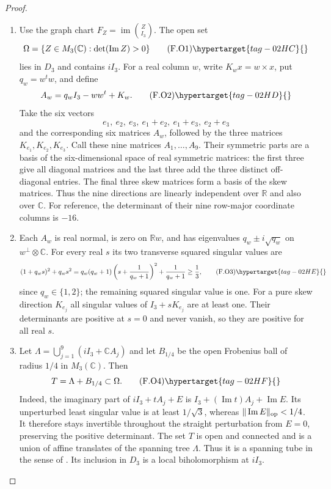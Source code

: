 \begin{proof}
\begin{enumerate}[label={$\langle1\rangle$\arabic*.}]
\item Use the graph chart $F_Z=\operatorname{im}\binom Z{I_3}$.
The open set
\[
 \Omega=\{Z\in M_3(\mathbb C):\det(\operatorname{Im}Z)>0\}
 \tag{F.O1}\hypertarget{tag-02HC}{}\label{maps:eq:F.O1}
\]
lies in $D_3$ and contains $iI_3$.  For a real column $w$, write
$K_w x=w\times x$, put $q_w=w^tw$, and define
\[
 A_w=q_wI_3-ww^t+K_w.
 \tag{F.O2}\hypertarget{tag-02HD}{}\label{maps:eq:F.O2}
\]
Take the six vectors
\[
 e_1,\ e_2,\ e_3,\ e_1+e_2,\ e_1+e_3,\ e_2+e_3
\]
and the corresponding six matrices $A_w$, followed by the three
matrices $K_{e_1},K_{e_2},K_{e_3}$.  Call these nine matrices
$A_1,\ldots,A_9$.  Their symmetric parts are a basis of the
six-dimensional space of real symmetric matrices: the first three
give all diagonal matrices and the last three add the three distinct
off-diagonal entries.  The final three skew matrices form a basis
of the skew matrices.  Thus the nine directions are linearly
independent over $\mathbb R$ and also over $\mathbb C$.
For reference, the determinant of their nine row-major coordinate
columns is $-16$.

\item Each $A_w$ is real normal, is zero on $\mathbb Rw$, and has
eigenvalues $q_w\pm i\sqrt{q_w}$ on $w^\perp\otimes\mathbb C$.
For every real $s$ its two transverse squared singular values are
\[
 (1+q_ws)^2+q_ws^2
 =q_w(q_w+1)\left(s+\frac1{q_w+1}\right)^2
       +\frac1{q_w+1}\ge\frac13,
 \tag{F.O3}\hypertarget{tag-02HE}{}\label{maps:eq:F.O3}
\]
since $q_w\in\{1,2\}$; the remaining squared singular value is one.
For a pure skew direction $K_{e_j}$ all singular values of
$I_3+sK_{e_j}$ are at least one.  Their determinants are positive
at $s=0$ and never vanish, so they are positive for all real $s$.

\item Let $\Lambda=\bigcup_{j=1}^9(iI_3+\mathbb C A_j)$ and let
$B_{1/4}$ be the open Frobenius ball of radius $1/4$ in
$M_3(\mathbb C)$.  Then
\[
 T=\Lambda+B_{1/4}\subset\Omega.
 \tag{F.O4}\hypertarget{tag-02HF}{}\label{maps:eq:F.O4}
\]
Indeed, the imaginary part of $iI_3+tA_j+E$ is
$I_3+(\operatorname{Im}t)A_j+\operatorname{Im}E$.
Its unperturbed least singular value is at least $1/\sqrt3$,
whereas $\|\operatorname{Im}E\|_{\rm op}<1/4$.
It therefore stays invertible throughout the straight perturbation
from $E=0$, preserving the positive determinant.
The set $T$ is open and connected and is a union of affine
translates of the spanning tree $\Lambda$.  Thus it is a spanning tube in the sense of
\cite[Definition 2.1, p.~4]{IVVOkaOneV5}.  Its inclusion in
$D_3$ is a local biholomorphism at $iI_3$.


\end{enumerate}
\end{proof}
